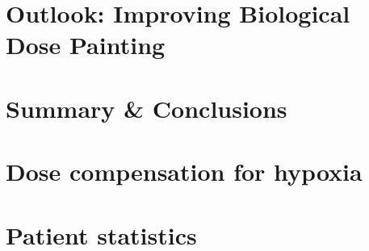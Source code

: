 \chapter{Outlook: Improving Biological Dose Painting}\label{chapter:6}


\chapter{Summary \& Conclusions}\label{chapter:X}


\newpage
\setcounter{page}{1}

\appendix
\chapter{Dose compensation for hypoxia}\label{appendix:a}
\chapter{Patient statistics}\label{appendix:b}



\cleardoublepage
{}
{}
\nocite{*}

\footnotesize{
 
}

\listoffigures
\listoftables

 
